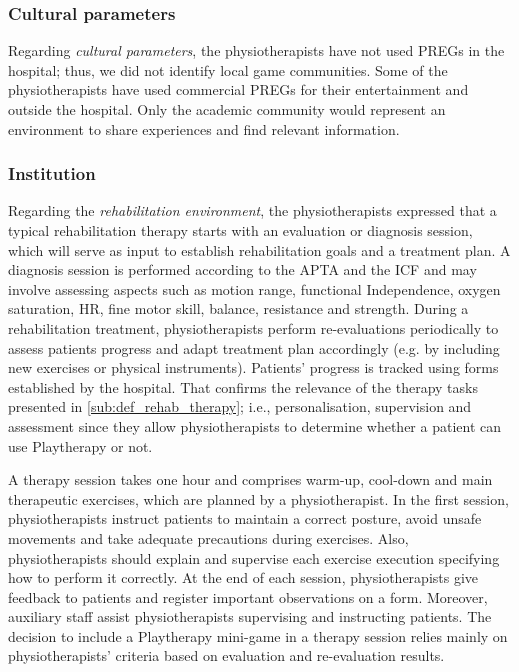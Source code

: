\subsubsection{Cultural parameters}
Regarding \emph{cultural parameters}, the physiotherapists have not used \acp{PREG} in the hospital; thus, we did not identify local game communities. Some of the physiotherapists have used commercial \acp{PREG} for their entertainment and outside the hospital. Only the academic community would represent an environment to share experiences and find relevant information. 

\subsubsection{Institution}
Regarding the \emph{rehabilitation environment}, the physiotherapists expressed that a typical rehabilitation therapy starts with an evaluation or diagnosis session, which will serve as input to establish rehabilitation goals and a treatment plan. A diagnosis session is performed according to the \ac{APTA} and the \ac{ICF} and may involve assessing aspects such as motion range, functional Independence, oxygen saturation, \ac{HR}, fine motor skill, balance, resistance and strength. During a rehabilitation treatment, physiotherapists perform re-evaluations periodically to assess patients progress and adapt treatment plan accordingly (e.g. by including new exercises or physical instruments). Patients' progress is tracked using forms established by the hospital. That confirms the relevance of the therapy tasks presented in \autoref{sub:def_rehab_therapy}; i.e., personalisation, supervision and assessment since they allow physiotherapists to determine whether a patient can use Playtherapy or not.

A therapy session takes one hour and comprises warm-up, cool-down and main therapeutic exercises, which are planned by a physiotherapist. In the first session, physiotherapists instruct patients to maintain a correct posture, avoid unsafe movements and take adequate precautions during exercises. Also, physiotherapists should explain and supervise each exercise execution specifying how to perform it correctly. At the end of each session, physiotherapists give feedback to patients and register important observations on a form. Moreover, auxiliary staff assist physiotherapists supervising and instructing patients. The decision to include a Playtherapy mini-game in a therapy session relies mainly on physiotherapists' criteria based on evaluation and re-evaluation results.

